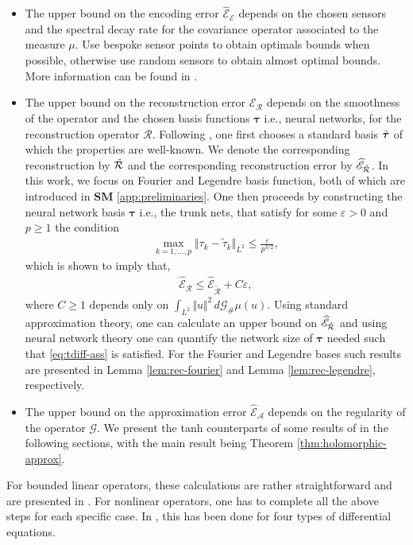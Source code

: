 \documentclass{article}
\numberwithin{equation}{section}
\renewcommand{\tilde}{\widetilde}
\newcommand{\Err}{\widehat{\mathscr{E}}}
\newcommand{\G}{\mathcal{G}}
\newcommand{\cA}{\mathcal{A}}
\newcommand{\cE}{\mathcal{E}}
\newcommand{\cR}{\mathcal{R}}
\newcommand{\tR}{\tilde{\cR}}
\renewcommand{\tr}{{{\tau}}}
\newcommand{\trunk}{{\bm{\tau}}}
\newcommand{\erre}{\Err_{\cE}}
\newcommand{\errr}{\Err_{\cR}}
\newcommand{\erra}{\Err_{\cA}}
\renewcommand{\epsilon}{\varepsilon}
\newcommand{\1}{\mathbbm{1}}
\begin{document}
\begin{itemize}
    \item The upper bound on the encoding error $\erre$ depends on the chosen sensors and the spectral decay rate for the covariance operator associated to the measure $\mu$. Use bespoke sensor points to obtain optimals bounds when possible, otherwise use random sensors to obtain almost optimal bounds. More information can be found in \cite[Section 3.5]{LMK1}. 
    \item The upper bound on the reconstruction error $\errr$ depends on the smoothness of the operator and the chosen basis functions $\trunk$ i.e., neural networks, for the reconstruction operator $\cR$. Following \cite[Section 3.4]{LMK1}, one first chooses a standard basis $\Tilde{\trunk}$ of which the properties are well-known. We denote the corresponding reconstruction by $\Tilde{\cR}$ and the corresponding reconstruction error by $\Err_{\Tilde{\cR}}$. In this work, we focus on Fourier and Legendre basis function, both of which are introduced in \textbf{SM} \ref{app:preliminaries}. One then proceeds by constructing the neural network basis $\trunk$ i.e., the trunk nets, that satisfy for some $\epsilon>0$ and $p\geq 1$ the condition
    \begin{align} \label{eq:tdiff-ass}
\max_{k=1,\dots, p} \Vert \tr_k - \tilde{\tr}_k \Vert_{L^2}
\le 
\frac{\epsilon}{p^{3/2}},
\end{align}
which is shown to imply that, 
\begin{align} \label{eq:err-rec-comp}
\Err_{\cR}
\le
\Err_{\tR}
+ 
C \epsilon,
\end{align}
where $C\ge 1$ depends only on $\int_{L^2} \Vert u \Vert^2 \, d\G_\#\mu(u)$. Using standard approximation theory, one can calculate an upper bound on $\Err_{\Tilde{\cR}}$ and using neural network theory one can quantify the network size of $\trunk$ needed such that \eqref{eq:tdiff-ass} is satisfied. For the Fourier and Legendre bases such results are presented in Lemma \ref{lem:rec-fourier} and Lemma \ref{lem:rec-legendre}, respectively. 

\item The upper bound on the approximation error $\erra$ depends on the regularity of the operator $\G$. We present the tanh counterparts of some results of \cite[Section 3.6]{LMK1} in the following sections, with the main result being Theorem \ref{thm:holomorphic-approx}.
\end{itemize}

For bounded linear operators, these calculations are rather straightforward and are presented in \cite[\textbf{SM} D]{LMK1}. For nonlinear operators, one has to complete all the above steps for each specific case. In \cite[Section 4]{LMK1}, this has been done for four types of differential equations. %
\end{document}
